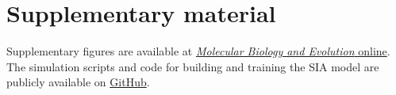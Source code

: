 \section{Supplementary material}

Supplementary figures are available at \href{https://academic.oup.com/mbe/article/39/1/msab332/6433161#supplementary-data}{\textit{Molecular Biology and Evolution} online}. The simulation scripts and code for building and training the \ac{SIA} model are publicly available on \href{https://github.com/CshlSiepelLab/arg-selection}{GitHub}.
